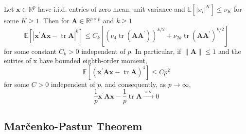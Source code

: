 \begin{lemma} \label{lem:quadratic-form-close-to-the-trace}
    Let $\mathbf{x} \in \mathbb{R}^{p}$ have i.i.d. entries of zero mean, unit variance and $\mathbb{E}\left[\left|x_{i}\right|^{K}\right] \leq \nu_{K}$ for some $K \geq 1 .$ Then for $\mathbf{A} \in \mathbb{R}^{p \times p}$ and $k \geq 1$
    $$
        \mathbb{E}\left[\left|\mathbf{x}^{\prime} \mathbf{A} \mathbf{x}-\operatorname{tr} \mathbf{A}\right|^{k}\right] \leq C_{k}\left[\left(\nu_{4} \operatorname{tr}\left(\mathbf{A} \mathbf{A}^{\prime}\right)\right)^{k / 2}+\nu_{2 k} \operatorname{tr}\left(\mathbf{A} \mathbf{A}^{\prime}\right)^{k / 2}\right]
    $$
    for some constant $C_{k}>0$ independent of $p .$ In particular, if $\|\mathbf{A}\| \leq 1$ and the entries of $\mathrm{x}$ have bounded eighth-order moment,
    $$
        \mathbb{E}\left[\left(\mathbf{x}^{\prime} \mathbf{A} \mathbf{x}-\operatorname{tr} \mathbf{A}\right)^{4}\right] \leq C p^{2}
    $$
    for some $C>0$ independent of $p$, and consequently, as $p \rightarrow \infty$,
    $$
        \frac{1}{p} \mathbf{x}^{\prime} \mathbf{A} \mathbf{x}-\frac{1}{p} \operatorname{tr} \mathbf{A} \stackrel{\text { a.s. }}{\longrightarrow} 0
    $$
\end{lemma}

\subsection*{Marčenko-Pastur Theorem}

